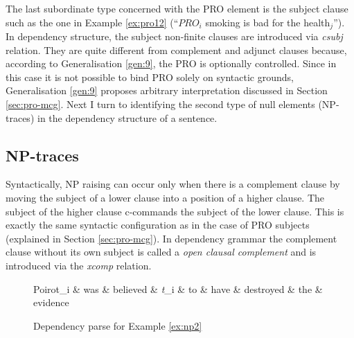     The last subordinate type concerned with the PRO element is the subject clause such as the one in Example \ref{ex:pro12} (``$PRO_i$ smoking is bad for the health$_j$''). In dependency structure, the subject non-finite clauses are introduced via \textit{csubj} relation. They are quite different from complement and adjunct clauses because, according to Generalisation \ref{gen:9}, the PRO is optionally controlled. Since in this case it is not possible to bind PRO solely on syntactic grounds, Generalisation \ref{gen:9} proposes arbitrary interpretation discussed in Section \ref{sec:pro-mcg}. Next I turn to identifying the second type of null elements (NP-traces) in the dependency structure of a sentence.

\subsection{NP-traces}
\label{sec:np-traces}
    Syntactically, NP raising can occur only when there is a complement clause by moving the subject of a lower clause into a position of a higher clause. The subject of the higher clause c-commands the subject of the lower clause. This is exactly the same syntactic configuration as in the case of PRO subjects (explained in Section \ref{sec:pro-mcg}). In dependency grammar the complement clause without its own subject is called a \textit{open clausal complement} and is introduced via the \textit{xcomp} relation.

    \begin{figure}[!ht]
    	\centering
    	\begin{dependency}
    		\begin{deptext}[]
    			Poirot_i \& was \& believed \& \textit{t}_i \& to \& have \& destroyed \& the \& evidence \\
    		\end{deptext}
    	\end{dependency}
    	\caption{Dependency parse for Example \ref{ex:np2}}
    	\label{fig:np-mcg1}
    \end{figure}
    
